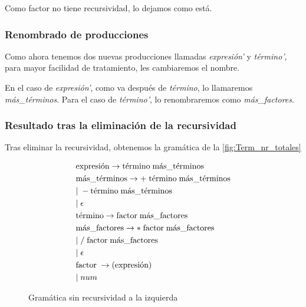 \documentclass[a4paper,twocolumn]{article}
\begin{document}
    Como factor no tiene recursividad, lo dejamos como está.

    \subsubsection{Renombrado de producciones}
    Como ahora tenemos dos nuevas producciones llamadas \textit{expresión'} y \textit{término'}, para mayor facilidad de tratamiento, les cambiaremos el nombre.

    En el caso de \textit{expresión'}, como va después de \textit{término}, lo llamaremos \textit{más\_términos}.
    Para el caso de \textit{término'}, lo renombraremos como \textit{más\_factores}.

    \subsubsection{Resultado tras la eliminación de la recursividad}
    Tras eliminar la recursividad, obtenemos la gramática de la \autoref{fig:Term_nr_totales}

    \clearpage

    \begin{figure}
        \begin{align}
            \label{eqc:gramaticaCorregida}
            &\text{expresión} \rightarrow \text{término} \; \text{más\_términos} \\
            &\text{más\_términos} \rightarrow  + \;\text{término} \; \text{más\_términos}
            \refstepcounter{equation}\nonumber  \\
            &\vert \; - \text{término} \; \text{más\_términos} \\
            &\vert \; \epsilon \\
            &\text{término} \rightarrow \text{factor} \; \text{más\_factores} \\
            &\text{más\_factores} \rightarrow  * \;\text{factor} \; \text{más\_factores} \\
            &\vert \; / \; \text{factor} \; \text{más\_factores} \\
            &\vert \; \epsilon \\
            &\text{factor} \; \rightarrow (\text{expresión})\\
            &\vert \; num\label{eq:numSinRecursividad}
        \end{align}
        \caption{Gramática sin recursividad a la izquierda}
        \label{fig:Term_nr_totales}
    \end{figure}
\end{document}
